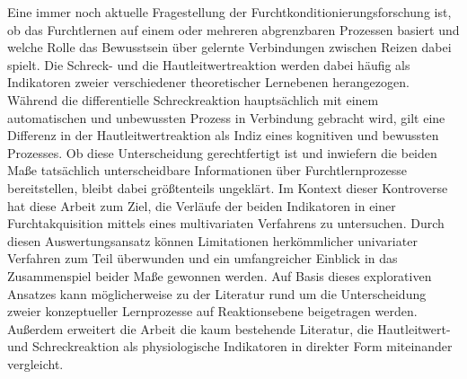 	Eine immer noch aktuelle Fragestellung der Furchtkonditionierungsforschung ist, ob das Furchtlernen auf einem oder mehreren abgrenzbaren Prozessen basiert und welche Rolle das Bewusstsein über gelernte Verbindungen zwischen Reizen dabei spielt.
	Die Schreck- und die Hautleitwertreaktion werden dabei häufig als Indikatoren zweier verschiedener theoretischer Lernebenen herangezogen. Während die differentielle Schreckreaktion hauptsächlich mit einem automatischen und unbewussten Prozess in Verbindung gebracht wird, gilt eine Differenz in der Hautleitwertreaktion als Indiz eines kognitiven und bewussten Prozesses. 
	Ob diese Unterscheidung gerechtfertigt ist und inwiefern die beiden Maße tatsächlich unterscheidbare Informationen über Furchtlernprozesse bereitstellen, bleibt dabei größtenteils ungeklärt. 
	Im Kontext dieser Kontroverse hat diese Arbeit zum Ziel, die Verläufe der beiden Indikatoren in einer Furchtakquisition mittels eines multivariaten Verfahrens zu untersuchen. Durch diesen Auswertungsansatz können Limitationen herkömmlicher univariater Verfahren zum Teil überwunden und ein umfangreicher Einblick in das Zusammenspiel beider Maße gewonnen werden. 	
	Auf Basis dieses explorativen Ansatzes kann möglicherweise zu der Literatur rund um die Unterscheidung zweier konzeptueller Lernprozesse auf Reaktionsebene beigetragen werden.
	Außerdem erweitert die Arbeit die kaum bestehende Literatur, die Hautleitwert- und Schreckreaktion als physiologische Indikatoren in direkter Form miteinander vergleicht. 

	



